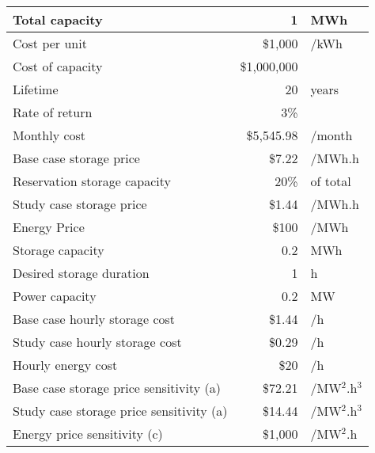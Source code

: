 \begin{tabular}{|l|rl|}
\hline
Total capacity & 1 & MWh\\ \hline
Cost per unit & \$1,000 & /kWh\\ \hline
Cost of capacity & \$1,000,000 & \\ \hline
Lifetime & 20 & years\\ \hline
Rate of return & 3\% & \\ \hline
Monthly cost & \$5,545.98 & /month\\ \hline
Base case storage price & \$7.22 & /MWh.h\\ \hline
Reservation storage capacity & 20\% & of total\\ \hline
Study case storage price & \$1.44 & /MWh.h\\ \hline
Energy Price & \$100 & /MWh\\ \hline
Storage capacity & 0.2 & MWh\\ \hline
Desired storage duration & 1 & h\\ \hline
Power capacity & 0.2 & MW\\ \hline
Base case hourly storage cost & \$1.44 & /h\\ \hline
Study case hourly storage cost & \$0.29 & /h\\ \hline
Hourly energy cost & \$20 & /h\\ \hline
Base case storage price sensitivity (a) & \$72.21 & /MW$^2$.h$^3$\\ \hline
Study case storage price sensitivity (a) & \$14.44 & /MW$^2$.h$^3$\\ \hline
Energy price sensitivity (c) & \$1,000 & /MW$^2$.h\\ \hline
\end{tabular}

